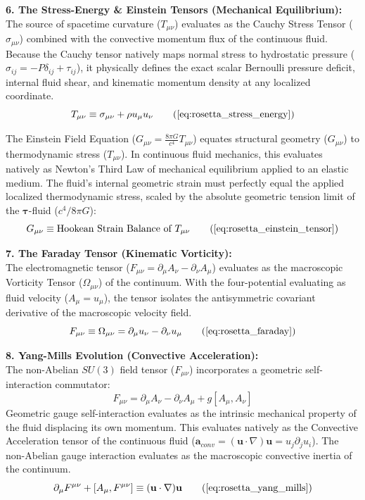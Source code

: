 \documentclass[11pt, a4paper]{article}
\begin{document}
\textbf{6. The Stress-Energy \& Einstein Tensors (Mechanical Equilibrium):} \\
The source of spacetime curvature ($T_{\mu\nu}$) evaluates as the Cauchy Stress Tensor ($\sigma_{\mu\nu}$) combined with the convective momentum flux of the continuous fluid. Because the Cauchy tensor natively maps normal stress to hydrostatic pressure ($\sigma_{ij} = -P \delta_{ij} + \tau_{ij}$), it physically defines the exact scalar Bernoulli pressure deficit, internal fluid shear, and kinematic momentum density at any localized coordinate.
\begin{equation}
    T_{\mu\nu} \equiv \sigma_{\mu\nu} + \rho u_\mu u_\nu \tag{\ref{eq:rosetta_stress_energy}}
\end{equation}

The Einstein Field Equation ($G_{\mu\nu} = \frac{8\pi G}{c^4} T_{\mu\nu}$) equates structural geometry ($G_{\mu\nu}$) to thermodynamic stress ($T_{\mu\nu}$). In continuous fluid mechanics, this evaluates natively as Newton's Third Law of mechanical equilibrium applied to an elastic medium. The fluid's internal geometric strain must perfectly equal the applied localized thermodynamic stress, scaled by the absolute geometric tension limit of the $\boldsymbol{\tau}$-fluid ($c^4/8\pi G$):
\begin{equation}
    G_{\mu\nu} \equiv \text{Hookean Strain Balance of } T_{\mu\nu} \tag{\ref{eq:rosetta_einstein_tensor}}
\end{equation}

\textbf{7. The Faraday Tensor (Kinematic Vorticity):} \\
The electromagnetic tensor ($F_{\mu\nu} = \partial_\mu A_\nu - \partial_\nu A_\mu$) evaluates as the macroscopic Vorticity Tensor ($\Omega_{\mu\nu}$) of the continuum. With the four-potential evaluating as fluid velocity ($A_\mu = u_\mu$), the tensor isolates the antisymmetric covariant derivative of the macroscopic velocity field.
\begin{equation}
    F_{\mu\nu} \equiv \Omega_{\mu\nu} = \partial_\mu u_\nu - \partial_\nu u_\mu \tag{\ref{eq:rosetta_faraday}}
\end{equation}

\textbf{8. Yang-Mills Evolution (Convective Acceleration):} \\
The non-Abelian $SU(3)$ field tensor ($F_{\mu\nu}$) incorporates a geometric self-interaction commutator:
\begin{equation}
    F_{\mu\nu} = \partial_\mu A_\nu - \partial_\nu A_\mu + g[A_\mu, A_\nu] 
\end{equation}
Geometric gauge self-interaction evaluates as the intrinsic mechanical property of the fluid displacing its own momentum. This evaluates natively as the Convective Acceleration tensor of the continuous fluid ($\mathbf{a}_{conv} = (\mathbf{u} \cdot \nabla)\mathbf{u} = u_j \partial_j u_i$). The non-Abelian gauge interaction evaluates as the macroscopic convective inertia of the continuum.
\begin{equation}
    \partial_\mu F^{\mu\nu} + [A_\mu, F^{\mu\nu}] \equiv (\mathbf{u} \cdot \nabla)\mathbf{u} \tag{\ref{eq:rosetta_yang_mills}}
\end{equation}
\end{document}
